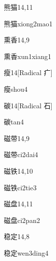 \begin{entry}{熊猫}{14,11}
  \begin{phonetics}{熊猫}{xiong2mao1}
  \end{phonetics}
\end{entry}

\begin{entry}{熏香}{14,9}
  \begin{phonetics}{熏香}{xun1xiang1}
  \end{phonetics}
\end{entry}

\begin{entry}{瘦}{14}[Radical 疒]
  \begin{phonetics}{瘦}{shou4}
  \end{phonetics}
\end{entry}

\begin{entry}{碳}{14}[Radical 石]
  \begin{phonetics}{碳}{tan4}
  \end{phonetics}
\end{entry}

\begin{entry}{磁带}{14,9}
  \begin{phonetics}{磁带}{ci2dai4}
  \end{phonetics}
\end{entry}

\begin{entry}{磁铁}{14,10}
  \begin{phonetics}{磁铁}{ci2tie3}
  \end{phonetics}
\end{entry}

\begin{entry}{磁盘}{14,11}
  \begin{phonetics}{磁盘}{ci2pan2}
  \end{phonetics}
\end{entry}

\begin{entry}{稳定}{14,8}
  \begin{phonetics}{稳定}{wen3ding4}
  \end{phonetics}
\end{entry}

